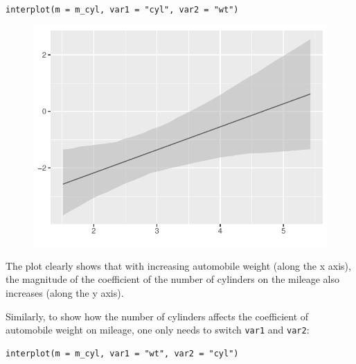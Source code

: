 \documentclass[
  article]{jss}
\begin{document}
\begin{verbatim}
interplot(m = m_cyl, var1 = "cyl", var2 = "wt")
\end{verbatim}

\begin{figure}[H]

{\centering \includegraphics{jss_manuscript_files/figure-pdf/unnamed-chunk-3-1.pdf}

}

\end{figure}

The plot clearly shows that with increasing automobile weight (along the
x axis), the magnitude of the coefficient of the number of cylinders on
the mileage also increases (along the y axis).

Similarly, to show how the number of cylinders affects the coefficient
of automobile weight on mileage, one only needs to switch \texttt{var1}
and \texttt{var2}:

\begin{verbatim}
interplot(m = m_cyl, var1 = "wt", var2 = "cyl")
\end{verbatim}
\end{document}
